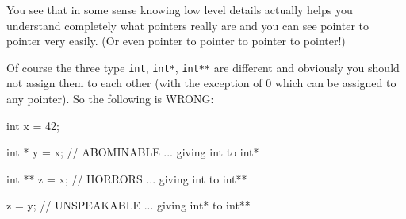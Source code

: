 You see that in some sense knowing low level details actually helps you understand completely what pointers really are and you can see pointer to pointer very easily. (Or even pointer to pointer to pointer to pointer!)

Of course the three type \texttt{int}, \texttt{int*}, \texttt{int**} are different and obviously you should not assign them to each other (with the exception of 0 which can be assigned to any pointer). So the following is WRONG:

\begin{consolethree}[escapeinside=||]
int x = 42;

int * y = x;    // ABOMINABLE ... giving int to int*

int ** z = x;   // HORRORS ... giving int to int**

z = y;          // UNSPEAKABLE ... giving int* to int** 
\end{consolethree}













